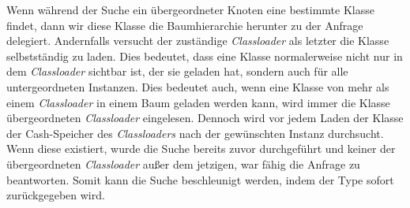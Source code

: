 Wenn während der Suche ein übergeordneter Knoten eine bestimmte Klasse findet, dann wir diese Klasse die Baumhierarchie herunter zu der Anfrage delegiert. Andernfalls versucht der zuständige \textit{Classloader} als letzter die Klasse selbstständig zu laden.
Dies bedeutet, dass eine Klasse normalerweise nicht nur in dem \textit{Classloader} sichtbar ist, der sie geladen hat, sondern auch für alle untergeordneten Instanzen. Dies bedeutet auch, wenn eine Klasse von mehr als einem \textit{Classloader} in einem Baum geladen werden kann, wird immer die Klasse übergeordneten \textit{Classloader} eingelesen. \newline
Dennoch wird vor jedem Laden der Klasse der Cash-Speicher des \textit{Classloaders} nach der gewünschten Instanz durchsucht. Wenn diese existiert, wurde die Suche bereits zuvor durchgeführt und keiner der übergeordneten \textit{Classloader} außer dem jetzigen, war fähig die Anfrage zu beantworten. Somit kann die Suche beschleunigt werden, indem der Type sofort zurückgegeben wird.

